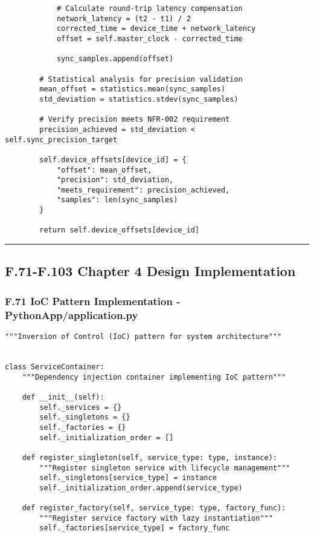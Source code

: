 \documentclass[12pt,a4paper]{report}
\begin{document}
{{\begin{verbatim}
            # Calculate round-trip latency compensation
            network_latency = (t2 - t1) / 2
            corrected_time = device_time + network_latency
            offset = self.master_clock - corrected_time

            sync_samples.append(offset)

        # Statistical analysis for precision validation
        mean_offset = statistics.mean(sync_samples)
        std_deviation = statistics.stdev(sync_samples)

        # Verify precision meets NFR-002 requirement
        precision_achieved = std_deviation < self.sync_precision_target

        self.device_offsets[device_id] = {
            "offset": mean_offset,
            "precision": std_deviation,
            "meets_requirement": precision_achieved,
            "samples": len(sync_samples)
        }

        return self.device_offsets[device_id]
\end{verbatim}

\hrule

\subsection{F.71-F.103 Chapter 4 Design Implementation}

\subsubsection{F.71 IoC Pattern Implementation - PythonApp/application.py}

\begin{verbatim}
"""Inversion of Control (IoC) pattern for system architecture"""


class ServiceContainer:
    """Dependency injection container implementing IoC pattern"""

    def __init__(self):
        self._services = {}
        self._singletons = {}
        self._factories = {}
        self._initialization_order = []

    def register_singleton(self, service_type: type, instance):
        """Register singleton service with lifecycle management"""
        self._singletons[service_type] = instance
        self._initialization_order.append(service_type)

    def register_factory(self, service_type: type, factory_func):
        """Register service factory with lazy instantiation"""
        self._factories[service_type] = factory_func


\end{verbatim}}}
\end{document}
